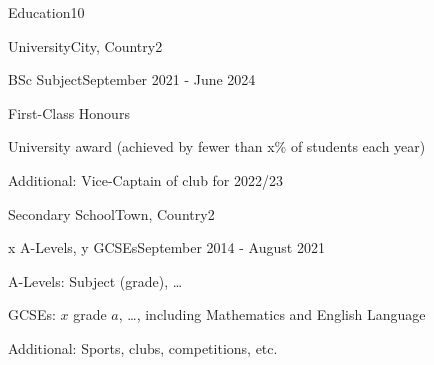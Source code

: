 \documentclass[10pt,a4paper]{CV}
\begin{document}

\begin{Section}{Education}{10}
    \begin{Institution}{University}{City, Country}{2}
        \begin{Position}{BSc Subject}{September 2021 - June 2024}
            \item First-Class Honours
            \item University award (achieved by fewer than x\% of students each year)
            \item Additional: Vice-Captain of club for 2022/23
        \end{Position}
    \end{Institution}

    \begin{Institution}{Secondary School}{Town, Country}{2}
        \begin{Position}{x A-Levels, y GCSEs}{September 2014 - August 2021}
            \item A-Levels: Subject (grade), \dots
            \item GCSEs: $x$ grade $a$, \dots, including Mathematics and English Language
            \item Additional: Sports, clubs, competitions, etc.
        \end{Position}
    \end{Institution}
\end{Section}
\end{document}
